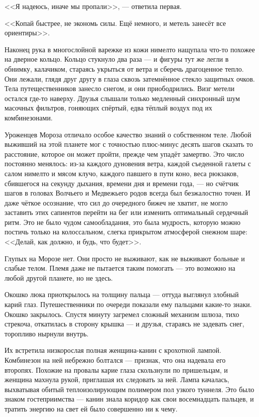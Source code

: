 <<Я надеюсь, иначе мы пропали>>, --- ответила первая.

<<Копай быстрее, не экономь силы.
Ещё немного, и метель занесёт все ориентиры>>.

Наконец рука в многослойной варежке из кожи нимелто нащупала что-то похожее на дверное кольцо.
Кольцо стукнуло два раза --- и фигуры тут же легли в обнимку, калачиком, стараясь укрыться от ветра и сберечь драгоценное тепло.
Они лежали, глядя друг другу в глаза сквозь затемнённое стекло защитных очков.
Тела путещественников занесло снегом, и они приободрились.
Визг метели остался где-то наверху.
Друзья слышали только медленный синхронный шум масочных фильтров, гоняющих спёртый, едва тёплый воздух под их комбинезонами.

Уроженцев Мороза отличало особое качество знаний о собственном теле.
Любой выживший на этой планете мог с точностью плюс-минус десять шагов сказать то расстояние, которое он может пройти, прежде чем упадёт замертво.
Это число постоянно менялось: из-за каждого дуновения ветра, каждой съеденной галеты с салом нимелто и мясом клучо, каждого павшего в пути коно, веса рюкзаков, сбившегося на секунду дыхания, времени дня и времени года, --- но счётчик шагов в головах Волчьего и Медвежьего родов всегда был безжалостно точен.
И даже чёткое осознание, что сил до очередного бижеч не хватит, не могло заставить этих сапиентов перейти на бег или изменить оптимальный сердечный ритм.
Это не было чудом самообладания, это была мудрость, которую можно постичь только на колоссальном, слегка прикрытом атмосферой снежном шаре: <<Делай, как должно, и будь, что будет>>.

Глупых на Морозе нет.
Они просто не выживают, как не выживают больные и слабые телом.
Племя даже не пытается таким помогать --- это возможно на любой другой планете, но не здесь.

Окошко люка приоткрылось на толщину пальца --- оттуда выглянул злобный карий глаз.
Путешественники по очереди показали ему пальцами какие-то знаки.
Окошко закрылось.
Спустя минуту загремел сложный механизм шлюза, тихо стрекоча, откатилась в сторону крышка --- и друзья, стараясь не задевать снег, торопливо нырнули внутрь.

Их встретила низкорослая полная женщина-канин с крохотной лампой.
Комбинезон на ней небрежно болтался --- признак, что она надевала его второпях.
Похожие на провалы карие глаза скользнули по пришельцам, и женщина махнула рукой, приглашая их следовать за ней.
Лампа качалась, выхватывая обитый теплоизолирующим полимером пол узкого туннеля.
Это было знаком гостеприимства --- канин знала коридор как свои восемнадцать пальцев, и тратить энергию на свет ей было совершенно ни к чему.

